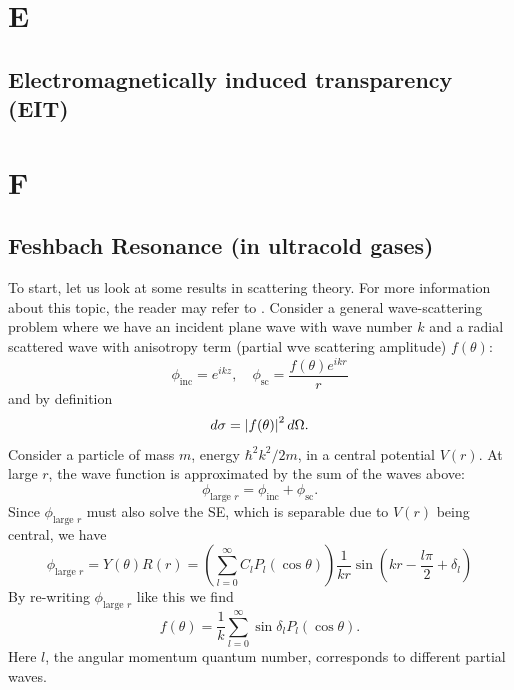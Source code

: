 \documentclass{book}
\theoremstyle{definition}
\newcommand{\f}[2]{\frac{#1}{#2}}
\newcommand{\lp}{\left(}
\newcommand{\rp}{\right)}
\begin{document}
\chapter*{E}



\section*{Electromagnetically induced transparency (EIT)}



\chapter*{F}


\section*{Feshbach Resonance (in ultracold gases)}


To start, let us look at some results in scattering theory. For more information about this topic, the reader may refer to \cite{sakurai1995modern}. Consider a general wave-scattering problem where we have an incident plane wave with wave number $k$ and a radial scattered wave with anisotropy term (partial wve scattering amplitude) $f(\theta)$: 
\begin{equation*}
\phi_\text{inc} = e^{ikz}, \quad \phi_{\text{sc}} = \f{f(\theta)e^{ikr}}{r}
\end{equation*}
and by definition
\begin{equation*}
d\sigma = \abs{f(\theta)}^2\, d\Omega.
\end{equation*}
Consider a particle of mass $m$, energy $\hbar^2k^2/2m$, in a central potential $V(r)$. At large $r$, the wave function is approximated by the sum of the waves above:
\begin{equation*}
\phi_{\text{large } r} = \phi_{\text{inc}} + \phi_{\text{sc}}. 
\end{equation*}
Since $\phi_{\text{large } r}$ must also solve the SE, which is separable due to $V(r)$ being central, we have \cite{bohm2012quantum}
\begin{equation*}
\phi_{\text{large } r} = Y(\theta)R(r) = \lp \sum^\infty_{l=0} C_l P_l(\cos\theta) \rp \f{1}{kr}\sin\lp kr - \f{l\pi}{2} + \delta_l \rp
\end{equation*}
By re-writing $\phi_\text{large $r$}$ like this we find 
\begin{equation*}
f(\theta) = \f{1}{k}\sum^\infty_{l=0} \sin \delta_l P_l(\cos\theta).
\end{equation*}
Here $l$, the angular momentum quantum number, corresponds to different partial waves. \\
\end{document}

